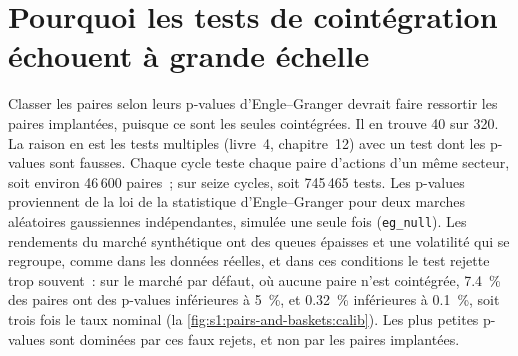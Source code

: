 \begin{omfigure}

\label{fig:s1:pairs-and-baskets:takeover}
\end{omfigure}

\section{Pourquoi les tests de cointégration échouent à grande échelle}

Classer les paires selon leurs p-values d'Engle--Granger devrait faire ressortir les paires implantées, puisque ce sont les seules cointégrées. Il en trouve 40 sur 320. La raison en est
les tests multiples (livre~4, chapitre~12) avec un test dont les p-values sont fausses. Chaque cycle teste chaque paire d'actions d'un même secteur, soit environ 46\,600 paires~;
sur seize cycles, soit 745\,465 tests. Les p-values proviennent de la loi de la statistique d'Engle--Granger pour deux marches aléatoires gaussiennes indépendantes, simulée
une seule fois (\texttt{eg\_null}). Les rendements du marché synthétique ont des queues épaisses et une volatilité qui se regroupe, comme dans les données réelles, et dans ces conditions le test
rejette trop souvent~: sur le marché par défaut, où aucune paire n'est cointégrée, 7.4~\% des paires ont des p-values inférieures à 5~\%, et 0.32~\% inférieures à 0.1~\%, soit trois fois le
taux nominal (la \cref{fig:s1:pairs-and-baskets:calib}). Les plus petites p-values sont dominées par ces faux rejets, et non par les paires implantées.


